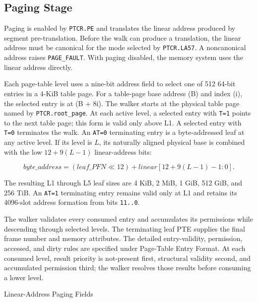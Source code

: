 \subsection{Paging Stage}

Paging is enabled by \texttt{PTCR.PE} and translates the linear address produced by segment pre-translation. Before
the walk can produce a translation, the linear address must be canonical for the mode selected by
\texttt{PTCR.LA57}. A noncanonical address raises \texttt{PAGE\_FAULT}. With paging disabled, the memory system uses
the linear address directly.

Each page-table level uses a nine-bit address field to select one of 512 64-bit entries in a 4-KiB table page. For a
table-page base address (B) and index (i), the selected entry is at (B + 8i). The walker starts at the physical
table page named by \texttt{PTCR.root\_page}. At each active level, a selected entry with \texttt{T=1} points to the
next table page; this form is valid only above L1. A selected entry with \texttt{T=0} terminates the walk. An
\texttt{AT=0} terminating entry is a byte-addressed leaf at any active level. If its level is $L$, its naturally
aligned physical base is combined with the low $12+9(L-1)$ linear-address bits:

\[
  \mathit{byte\_address} = (\mathit{leaf\_PFN} \ll 12) +
  \mathit{linear}[12+9(L-1)-1:0].
\]

The resulting L1 through L5 leaf sizes are 4 KiB, 2 MiB, 1 GiB, 512 GiB, and 256 TiB. An \texttt{AT=1}
terminating entry remains valid only at L1 and retains its 4096-slot address formation from bits \texttt{11..0}.

The walker validates every consumed entry and accumulates its permissions while descending through selected levels.
The terminating leaf PTE supplies the final frame number and memory attributes. The detailed entry-validity,
permission, accessed, and dirty rules are specified under Page-Table Entry Format. At each consumed level, result
priority is not-present first, structural validity second, and accumulated permission third; the walker resolves
those results before consuming a lower level.

\begin{manuallistedformatdiagram}{Linear-Address Paging Fields}
\end{manuallistedformatdiagram}

